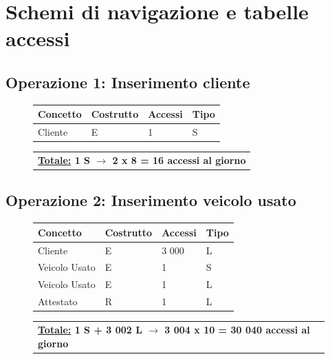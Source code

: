 \documentclass[a4paper,12pt]{report}
\begin{document}
\section{Schemi di navigazione e tabelle accessi}
\subsection*{Operazione 1: Inserimento cliente}
\begin{figure}[ht]
	\centering
	\begin{tabular}{L{3cm}C{2.5cm}C{4.5cm}C{2.5cm}}
		\rule[-1.5mm]{0mm}{0.60cm}{}
		\textbf{Concetto} & \textbf{Costrutto} &\textbf{Accessi} & \textbf{Tipo} \\	
		\hline\rule[-2mm]{0mm}{0.65cm}{}
		Cliente & E & 1 & S \\
	\end{tabular}
	
	\begin{tabular}{C{13.9cm}}
		\rule[-3mm]{0mm}{0.85cm}{}	
		 \textbf{\underline{Totale:} 1 S $\to$ 2 x 8 = 16 accessi al giorno}
	\end{tabular}
\end{figure}

\subsection*{Operazione 2: Inserimento veicolo usato}
\begin{figure}[ht]
	\centering
	\begin{tabular}{L{3cm}C{2.5cm}C{4.5cm}C{2.5cm}}
		\rule[-2mm]{0mm}{0.6cm}{}
		\textbf{Concetto} & \textbf{Costrutto} &\textbf{Accessi} & \textbf{Tipo} \\
		\hline\rule[-2mm]{0mm}{0.65cm}{}
		Cliente & E & 3 000 & L \\
		\hline\rule[-2mm]{0mm}{0.65cm}{}
		Veicolo Usato & E & 1 & S \\
		\hline\rule[-2mm]{0mm}{0.65cm}{}
		Veicolo Usato & E & 1 & L \\
		\hline\rule[-2mm]{0mm}{0.65cm}{}
		Attestato & R & 1 & L \\
	\end{tabular}
	
	\begin{tabular}{C{13.9cm}}
		\rule[-3mm]{0mm}{0.85cm}{}	
		 \textbf{\underline{Totale:} 1 S + 3 002 L $\to$ 3 004 x 10 = 30 040 accessi al giorno}
	\end{tabular}
\end{figure}
\end{document}

